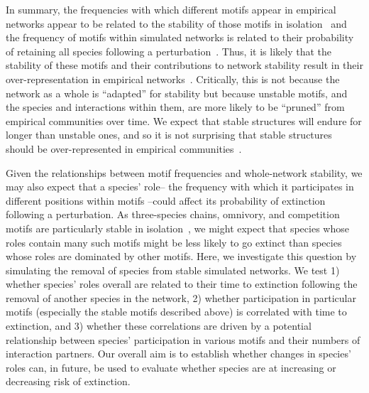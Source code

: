 \documentclass[12pt]{article}
\begin{document}
	In summary, the frequencies with which different motifs appear in empirical networks appear to be related to the stability of those motifs in isolation~\citep{Stouffer2010b,Borrelli2015a} and the frequency of motifs within simulated networks is related to their probability of retaining all species following a perturbation~\citep{Stouffer2010b}. Thus, it is likely that the stability of these motifs and their contributions to network stability result in their over-representation in empirical networks~\citep{Borrelli2015}. Critically, this is not because the network as a whole is ``adapted'' for stability but because unstable motifs, and the species and interactions within them, are more likely to be ``pruned'' from empirical communities over time. We expect that stable structures will endure for longer than unstable ones, and so it is not surprising that stable structures should be over-represented in empirical communities~\citep{Borrelli2015}.


	Given the relationships between motif frequencies and whole-network stability, we may also expect that a species' role-- the frequency with which it participates in different positions within motifs --could affect its probability of extinction following a perturbation. As three-species chains, omnivory, and competition motifs are particularly stable in isolation~\citep{Borrelli2015a}, we might expect that species whose roles contain many such motifs might be less likely to go extinct than species whose roles are dominated by other motifs. Here, we investigate this question by simulating the removal of species from stable simulated networks. We test 1) whether species' roles overall are related to their time to extinction following the removal of another species in the network, 2) whether participation in particular motifs (especially the stable motifs described above) is correlated with time to extinction, and 3) whether these correlations are driven by a potential relationship between species' participation in various motifs and their numbers of interaction partners. Our overall aim is to establish whether changes in species' roles can, in future, be used to evaluate whether species are at increasing or decreasing risk of extinction.


\end{document}
